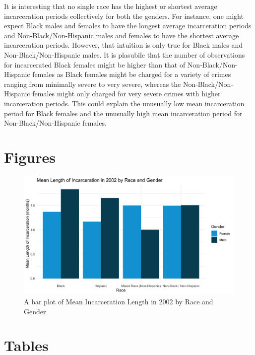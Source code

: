 \documentclass{article}
\begin{document}
It is interesting that no single race has the highest or shortest average incarceration periods collectively for both the genders.
For instance, one might expect Black males and females to have the longest average incarceration periods and Non-Black/Non-Hispanic males and females to have the shortest average incarceration periods. However, that intuition is only true for Black males and Non-Black/Non-Hispanic males. It is plasubile that the number of observations for incarcerated Black females might be higher than that of Non-Black/Non-Hispanic females as Black females might be charged for a variety of crimes ranging from minimally severe to very severe, whereas the Non-Black/Non-Hispanic females might only charged for very severe crimes with higher incarceration periods. This could explain the unusually low mean incarceration period for Black females and the unusually high mean incarceration period for Non-Black/Non-Hispanic females. 

\section{Figures}

\begin{figure}[H]
    \begin{center}
        \includegraphics[width=.85\textwidth]{incar_length_by_racegender}
    \end{center}
    \caption{A bar plot of Mean Incarceration Length in 2002 by Race and Gender}
    \label{fig:graph}
\end{figure}

\section{Tables}




\end{document}
